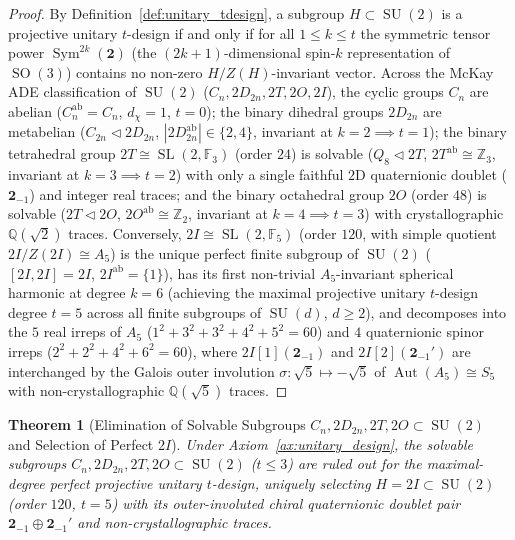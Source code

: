\documentclass[11pt,a4paper]{article}
\newtheorem{theorem}{Theorem}[section]
\theoremstyle{definition}
\theoremstyle{remark}
\newcommand{\Z}{\mathbb{Z}}
\newcommand{\Q}{\mathbb{Q}}
\newcommand{\F}{\mathbb{F}}
\newcommand{\SU}{\operatorname{SU}}
\newcommand{\SO}{\operatorname{SO}}
\newcommand{\SL}{\operatorname{SL}}
\begin{document}
\begin{proof}
By Definition~\ref{def:unitary_tdesign}, a subgroup $H \subset \SU(2)$ is a projective unitary $t$-design if and only if for all $1 \le k \le t$ the symmetric tensor power $\operatorname{Sym}^{2k}(\mathbf{2})$ (the $(2k+1)$-dimensional spin-$k$ representation of $\SO(3)$) contains no non-zero $H/Z(H)$-invariant vector. Across the McKay ADE classification of $\SU(2)$ ($C_n, 2D_{2n}, 2T, 2O, 2I$), the cyclic groups $C_n$ are abelian ($C_n^{\mathrm{ab}} = C_n$, $d_\chi = 1$, $t = 0$); the binary dihedral groups $2D_{2n}$ are metabelian ($C_{2n} \triangleleft 2D_{2n}$, $|2D_{2n}^{\mathrm{ab}}| \in \{2, 4\}$, invariant at $k = 2 \implies t = 1$); the binary tetrahedral group $2T \cong \SL(2,\F_3)$ (order $24$) is solvable ($Q_8 \triangleleft 2T$, $2T^{\mathrm{ab}} \cong \Z_3$, invariant at $k = 3 \implies t = 2$) with only a single faithful $2$D quaternionic doublet ($\mathbf{2}_{-1}$) and integer real traces; and the binary octahedral group $2O$ (order $48$) is solvable ($2T \triangleleft 2O$, $2O^{\mathrm{ab}} \cong \Z_2$, invariant at $k = 4 \implies t = 3$) with crystallographic $\Q(\sqrt{2})$ traces. Conversely, $2I \cong \SL(2,\F_5)$ (order $120$, with simple quotient $2I/Z(2I) \cong A_5$) is the unique perfect finite subgroup of $\SU(2)$ ($[2I, 2I] = 2I$, $2I^{\mathrm{ab}} = \{1\}$), has its first non-trivial $A_5$-invariant spherical harmonic at degree $k = 6$ (achieving the maximal projective unitary $t$-design degree $t = 5$ across all finite subgroups of $\SU(d)$, $d \ge 2$), and decomposes into the $5$ real irreps of $A_5$ ($1^2 + 3^2 + 3^2 + 4^2 + 5^2 = 60$) and $4$ quaternionic spinor irreps ($2^2 + 2^2 + 4^2 + 6^2 = 60$), where $2I[1](\mathbf{2}_{-1})$ and $2I[2](\mathbf{2}_{-1}')$ are interchanged by the Galois outer involution $\sigma: \sqrt{5} \mapsto -\sqrt{5}$ of $\operatorname{Aut}(A_5) \cong S_5$ with non-crystallographic $\Q(\sqrt{5})$ traces.
\end{proof}

\begin{theorem}[Elimination of Solvable Subgroups $C_n, 2D_{2n}, 2T, 2O \subset \SU(2)$ and Selection of Perfect $2I$]
\label{thm:2I_minimal}
Under Axiom~\ref{ax:unitary_design}, the solvable subgroups $C_n, 2D_{2n}, 2T, 2O \subset \SU(2)$ ($t \le 3$) are ruled out for the maximal-degree perfect projective unitary $t$-design, uniquely selecting $H = 2I \subset \SU(2)$ (order $120$, $t = 5$) with its outer-involuted chiral quaternionic doublet pair $\mathbf{2}_{-1} \oplus \mathbf{2}_{-1}'$ and non-crystallographic traces.
\end{theorem}
\end{document}
